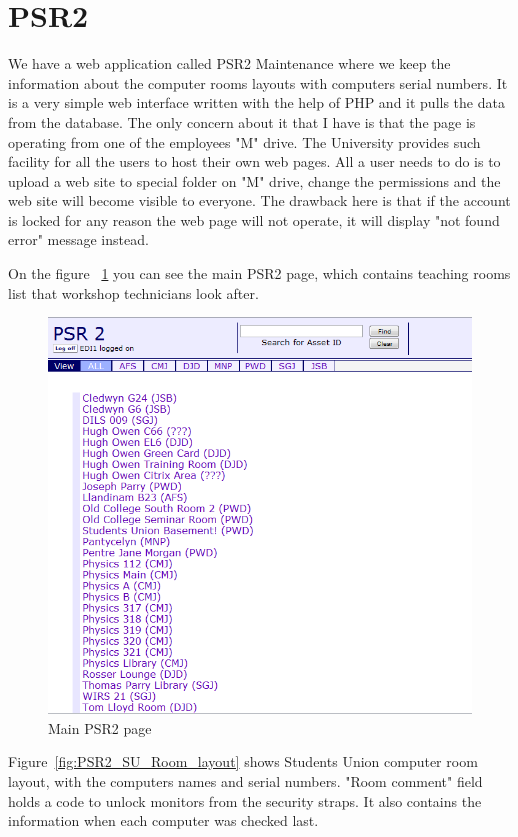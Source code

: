 \documentclass[10pt,a4paper,headinclude=true,twoside]{report}
\begin{document}
\section{PSR2}
We have a web application called PSR2 Maintenance where we keep the information about the computer rooms layouts with computers serial numbers. It is a very simple web interface written with the help of PHP and it pulls the data from the database. The only concern about it that I have is that the page is operating from one of the employees "M" drive. The University provides such facility for all the users to host their own web pages. All a user needs to do is to upload a web site to special folder on "M" drive, change the permissions and the web site will become visible to everyone. The drawback here is that if the account is locked for any reason the web page will not operate, it will display "not found error" message instead. 

On the figure ~\ref{fig:main_PSR2_page} you can see the main PSR2 page, which contains teaching rooms list that workshop technicians look after.

\begin{figure}[H]
\centering
\centerline{\includegraphics[scale=0.3]{./PSR2}}
\caption{Main PSR2 page}
\label{fig:main_PSR2_page}
\end{figure}

Figure~\ref{fig:PSR2_SU_Room_layout} shows Students Union computer room layout, with the computers names and serial numbers. "Room comment" field holds a code to unlock monitors from the security straps. It also contains the information when each computer was checked last.
\end{document}
